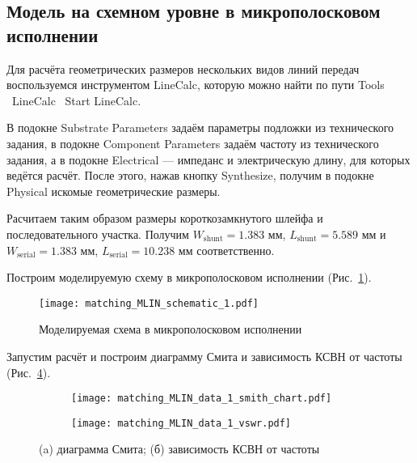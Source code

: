 \subsection{Модель на схемном уровне в микрополосковом исполнении}

Для расчёта геометрических размеров нескольких видов линий передач воспользуемся инструментом LineCalc, которую можно найти по пути Tools \textrightarrow\ LineCalc \textrightarrow\ Start LineCalc.

В подокне Substrate Parameters задаём параметры подложки из технического задания, в подокне Component Parameters задаём частоту из технического задания, а в подокне Electrical --- импеданс и электрическую длину, для которых ведётся расчёт.
После этого, нажав кнопку Synthesize, получим в подокне Physical искомые геометрические размеры.

Расчитаем таким образом размеры короткозамкнутого шлейфа и последовательного участка.
Получим $W_\text{shunt} = 1.383 \text{~мм}$, $L_\text{shunt} = 5.589 \text{~мм}$ и $W_\text{serial} = 1.383 \text{~мм}$, $L_\text{serial} = 10.238 \text{~мм}$ соответственно.

Построим моделируемую схему в микрополосковом исполнении (Рис.~\ref{fig:matching_MLIN_schematic_1}).

\begin{figure}[!ht]
    \centering
    \texttt{[image: matching\_MLIN\_schematic\_1.pdf]}
    \caption{Моделируемая схема в микрополосковом исполнении}%
    \label{fig:matching_MLIN_schematic_1}
\end{figure}

Запустим расчёт и построим диаграмму Смита и зависимость КСВН от частоты (Рис.~\ref{fig:matching_MLIN_data_display_1}).

\begin{figure}[!ht]
    \begin{subfigure}[b]{0.45\textwidth}
        \centering
        \texttt{[image: matching\_MLIN\_data\_1\_smith\_chart.pdf]}
        \caption{}%
    \label{fig:matching_MLIN_data_1_smith_chart}
    \end{subfigure}
    \hfill
    \begin{subfigure}[b]{0.45\textwidth}
        \centering
        \texttt{[image: matching\_MLIN\_data\_1\_vswr.pdf]}
        \caption{}%
    \label{fig:matching_MLIN_data_1_vswr}
    \end{subfigure}
    \caption{%
        (a) диаграмма Смита;
        (б) зависимость КСВН от частоты
    }%
    \label{fig:matching_MLIN_data_display_1}
\end{figure}

